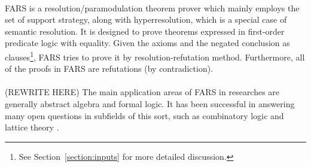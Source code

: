 \documentclass[11pt]{report}
\begin{document}
\paragraph{} FARS is a resolution/paramodulation theorem prover which mainly employs the set of support strategy, along with hyperresolution, which is a special case of semantic resolution. It is designed to prove theorems expressed in first-order predicate logic with equality. Given the axioms and the negated conclusion as clauses\footnote{See Section~\ref{section:inputs} for more detailed discussion.}, FARS tries to prove it by resolution-refutation method. Furthermore, all of the proofs in FARS are refutations (by contradiction). 

\paragraph{} (REWRITE HERE) The main application areas of FARS in researches are generally abstract algebra and formal logic. It has been successful in answering many open questions in subfields of this sort, such as combinatory logic  and lattice theory .

% 
% 
\end{document}
